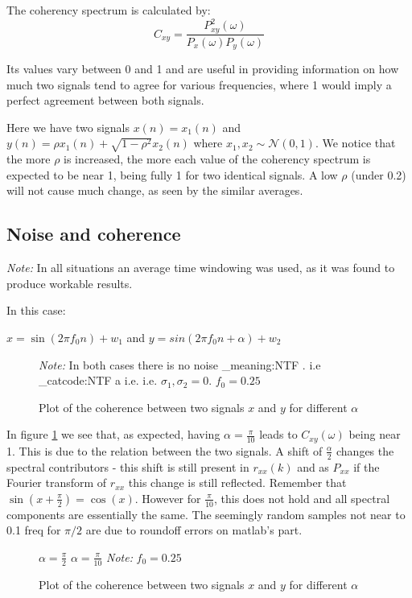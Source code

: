 \documentclass[10pt,twoside,a4paper]{report}
\makeatletter
\newcommand\latinabbrev[1]{
  \peek_meaning:NTF . {%
    #1\@}%
  { \peek_catcode:NTF a {%
      #1.\@ }%
    {#1.\@}}}
\makeatother
\begin{document}
The coherency spectrum is calculated by:
\begin{equation}
C_{xy} = \frac{P_{xy}^2(\omega)}{P_x(\omega)P_y(\omega)}
\end{equation}

Its values vary between 0 and 1 and are useful in providing information on how much two signals tend to agree for various frequencies, where 1 would imply a perfect agreement between both signals.

Here we have two signals $x(n)=x_1(n)$ and $y(n)=\rho x_1(n)+ \sqrt{1-\rho^2}x_2(n)$ where $x_1 , x_2 \sim \mathcal{N}(0,1)$. We notice that the more $\rho$ is increased, the more each value of the coherency spectrum is expected to be near 1, being fully 1 for two identical signals. A low $\rho$ (under 0.2) will not cause much change, as seen by the similar averages.

\subsection{Noise and coherence}

\textit{Note:} In all situations an average time windowing was used, as it was found to produce workable results.

In this case:

$x = \sin (2\pi f_0n) + w_1$ and $y = sin(2\pi f_0n + \alpha) + w_2$

\begin{figure}[h!]
\centering

\resizebox{\textwidth}{!}{}
\textit{Note:} In both cases there is no noise \latinabbrev{i.e} $\sigma_1 , \sigma_2 = 0$. $f_0=0.25$
\caption{Plot of the coherence between two signals $x$ and $y$ for different $\alpha$}
\label{fig:2_1b}
\end{figure}
In figure \ref{fig:2_1b} we see that, as expected, having $\alpha = \frac{\pi}{10}$ leads to $C_{xy}(\omega)$ being near 1. This is due to the relation between the two signals. A shift of $\frac{\alpha}{2}$ changes the spectral contributors - this shift is still present in $r_{xx}(k)$ and as $P_{xx}$ if the Fourier transform of $r_{xx}$ this change is still reflected. Remember that $\sin(x+\frac{\pi}{2}) = \cos(x)$. However for $\frac{\pi}{10}$, this does not hold and all spectral components are essentially the same. The seemingly random samples not near to 0.1 freq for $\pi/2$ are due to roundoff errors on matlab's part. 

\begin{figure}[h!]
\centering
$\alpha = \frac{\pi}{2}$
\resizebox{\textwidth}{!}{}
$\alpha = \frac{\pi}{10}$
\resizebox{\textwidth}{!}{}
\textit{Note:} $f_0=0.25$
\caption{Plot of the coherence between two signals $x$ and $y$ for different $\alpha$}
\label{fig:2_1b2}
\end{figure}
\end{document}
